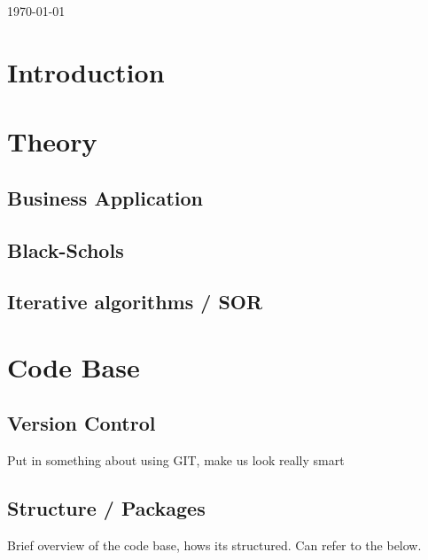 \documentclass[paper=a4, fontsize=10pt]{scrartcl} %
\begin{document}
\begin{titlepage}

\vspace{3cm}
{\large \today}\\[1cm] %

\vfill %

\end{titlepage}

\tableofcontents
\clearpage
\onecolumn
\section{Introduction}
\clearpage
\section{Theory}
\subsection {Business Application}
\subsection {Black-Schols}
\subsection {Iterative algorithms / SOR}
\clearpage
\section{Code Base}
\subsection {Version Control}
{Put in something about using GIT, make us look really smart}
\subsection {Structure / Packages}
{Brief overview of the code base, hows its structured. Can refer to the below.}\\\\
\end{document}
